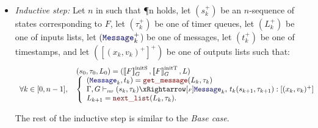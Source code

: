 \begin{skippableproof}
\begin{itemize}
\begin{itemize}
                        The rule  ensures
                        that:
                        \begin{equation*}
                            \serviceOpSem{s_0}{\tau_0}{F}{\mess_0}{t_0}{s_1}{\tau_1}{(x_0, v_0)^+},
                        \end{equation*}

                        Let $L_1$ be the remaining list $L_0$.
              \end{itemize}
              Then \P{1} holds.

        \item \textit{Inductive step:} Let $n$ in \Nstar such that \P{n} holds, let $(s_k^+)$ be an
              $n$-sequence of states corresponding to $F$, let $(\tau_k^+)$ be one of timer queues,
              let $(L_k^+)$ be one of inputs lists, let $(\mess_k^+$) be one of messages, let
              $(t_k^+)$ be one of timestamps, and let $([(x_k, v_k)^+]^+)$ be one of outputs lists
              such that:
              \begin{equation*}
                  \begin{array}{ll}
                                                 & (s_0, \tau_0, L_0) = (\initstate{F}, \inittimer{F}, L) \\
                      \forall k \in [0, n-1], \, &
                      \left\{
                      \begin{array}{l}
                          (\mess_k, t_k) = \getMess{L_k}{\tau_k}                                         \\
                          \serviceOpSem{s_k}{\tau_k}{F}{\mess_k}{t_k}{s_{k+1}}{\tau_{k+1}}{(x_k, v_k)^+} \\
                          L_{k+1} = \nextList{L_k}{\tau_k}.
                      \end{array}
                      \right.
                  \end{array}
              \end{equation*}

              The rest of the inductive step is similar to the \textit{Base case}.


\end{itemize}
\end{skippableproof}
